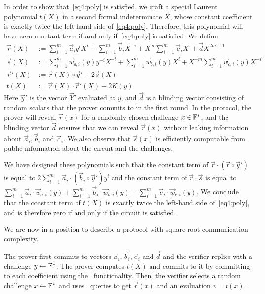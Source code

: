 In order to show that~\eqref{eq4:poly} is satisfied, we craft a special Laurent polynomial $t(X)$ in a second formal indeterminate $X$, whose constant coefficient is exactly twice the left-hand side of~\eqref{eq4:poly}. Therefore, this polynomial will have zero constant term if and only if~\eqref{eq4:poly} is satisfied.
%
We define
\begin{align*}
\vec{r}(X)&:=\sum_{i=1}^m\vec{a}_{i}y^i X^{i}+\sum_{i=1}^m\vec{b}_{i} X^{-i}+X^m \sum_{i=1}^m\vec{c}_{i} X^{i}+\vec{d}X^{2m+1}\\
\vec{s}(X)&:=\sum_{i=1}^m\vec{w}_{a,i}(y)y^{-i} X^{-i}+\sum_{i=1}^m\vec{w}_{b,i}(y)X^{i}+ X^{-m} \sum_{i=1}^m\vec{w}_{c,i} (y) X^{-i}\\
\vec{r}'(X) &:= \vec{r}(X) \circ \vec{y}' + 2\vec{s}(X)\\
t(X)&:=\vec{r}(X)\cdot \vec{r}'(X)-2K(y)
\end{align*}
Here $\vec{y}'$ is the vector $\vec{Y}'$ evaluated at $y$, and $\vec{d}$ is a blinding vector consisting of random scalars that the prover commits to in the first round.
%
In the protocol, the prover will reveal $\vec{r}(x)$ for a randomly chosen challenge $x\in \mathbb{F}^*$, and the blinding vector $\vec{d}$ ensures that we can reveal $\vec{r}(x)$ without leaking information about $\vec{a}_{i},\vec{b}_i$ and $\vec{c}_i$.
%
We also observe that $\vec{s}(x)$ is efficiently computable from public information about the circuit and the challenges.

We have designed these polynomials such that the constant term of $\vec{r} \cdot ( \vec{r} \circ \vec{y}')$ is equal to $2 \sum_{i=1}^m  \vec{a}_i  \cdot (\vec{b}_i \circ \vec{y}') y^i$ and the constant term of $\vec{r} \cdot \vec{s}$ is equal to $ \sum_{i=1}^m \vec{a}_i  \cdot \vec{w}_{a,i}(y)  +\sum_{i=1}^m \vec{b}_i \cdot \vec{w}_{b,i}(y)   +\sum_{i=1}^m \vec{c}_i \cdot \vec{w}_{c,i}(y) $.
%
We conclude that the constant term of $t(X)$ is exactly twice the left-hand side of~\eqref{eq4:poly}, and is therefore zero if and only if the circuit is satisfied.

We are now in a position to describe a protocol with square root communication complexity. %
%

The prover first commits to vectors $\vec{a}_{i},\vec{b}_i,\vec{c}_i$ and $\vec{d}$ and the verifier replies with a challenge $y\gets \mathbb{F}^*$. The prover  computes $t(X)$ and commits to it by committing to each coefficient using the \ILC\ functionality.
Then, the verifier selects a random challenge $x\gets \mathbb{F}^*$ and uses \ILC\ queries to get $\vec{r}(x)$ and an evaluation $v = t(x)$. 

